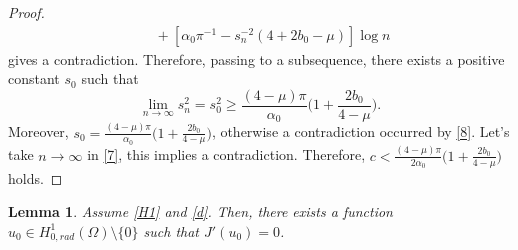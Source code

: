 \documentclass[11pt]{amsart}
\numberwithin{equation}{section}
\newtheorem{lem}[thm]{Lemma}
\newcommand{\1}{\frac{1}{2}}
\begin{document}
\begin{proof}
\begin{align}
			& \quad+ [\alpha_0 \pi^{-1}-s_n^{-2}(4+2b_0-\mu)]\log{n} \nonumber
		\end{align}
		gives a contradiction. Therefore, passing to a subsequence, there exists a positive constant $s_0$ such that
		\[\lim_{n\rightarrow \infty} s_n^2 = s_0^2 \geq \frac{(4-\mu)\pi}{\alpha_0} \Big( 1+ \frac{2b_0}{4-\mu}\Big).\]
		Moreover, $s_0= \frac{(4-\mu)\pi}{\alpha_0}\Big( 1+ \frac{2b_0}{4-\mu}\Big)$, otherwise a contradiction occurred by \eqref{8}. Let's take $n\rightarrow\infty$ in \eqref{7}, this implies a contradiction. Therefore, $c < \frac{(4-\mu)\pi}{2\alpha_0} \Big( 1+\frac{2b_0}{4-\mu}\Big)$ holds.
	\end{proof}
	
	\begin{lem}
		\label{lem4.6}
		Assume \eqref{H1} and \eqref{d}. Then, there exists a function $u_0\in H^1_{0,rad}(\Omega) \setminus \{0\}$ such that $J'(u_0)=0$.
	\end{lem}
\end{document}
